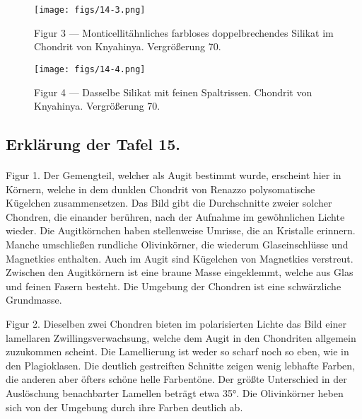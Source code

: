 \documentclass[a4paper, 12pt, oneside]{article}
\begin{document}
\vspace*{\fill}
\begin{figure}[H]
\centering
\texttt{[image: figs/14-3.png]}
\caption{\small Figur 3 --- Monticellitähnliches farbloses doppelbrechendes Silikat im Chondrit von Knyahinya. Vergrößerung 70.}
\end{figure}
\vspace*{\fill}
\clearpage

\vspace*{\fill}
\begin{figure}[H]
\centering
\texttt{[image: figs/14-4.png]}
\caption{\small Figur 4 --- Dasselbe Silikat mit feinen Spaltrissen. Chondrit von Knyahinya. Vergrößerung 70.}
\end{figure}
\vspace*{\fill}
\clearpage

\subsection{Erklärung der Tafel 15.}
\paragraph{}
Figur 1. Der Gemengteil, welcher als Augit bestimmt wurde, erscheint hier in Körnern, welche in dem dunklen Chondrit von Renazzo polysomatische Kügelchen zusammensetzen. Das Bild gibt die Durchschnitte zweier solcher Chondren, die einander berühren, nach der Aufnahme im gewöhnlichen Lichte wieder. Die Augitkörnchen haben stellenweise Umrisse, die an Kristalle erinnern. Manche umschließen rundliche Olivinkörner, die wiederum Glaseinschlüsse und Magnetkies enthalten. Auch im Augit sind Kügelchen von Magnetkies verstreut. Zwischen den Augitkörnern ist eine braune Masse eingeklemmt, welche aus Glas und feinen Fasern besteht. Die Umgebung der Chondren ist eine schwärzliche Grundmasse.

Figur 2. Dieselben zwei Chondren bieten im polarisierten Lichte das Bild einer lamellaren Zwillingsverwachsung, welche dem Augit in den Chondriten allgemein zuzukommen scheint. Die Lamellierung ist weder so scharf noch so eben, wie in den Plagioklasen. Die deutlich gestreiften Schnitte zeigen wenig lebhafte Farben, die anderen aber öfters schöne helle Farbentöne. Der größte Unterschied in der Auslöschung benachbarter Lamellen beträgt etwa 35°. Die Olivinkörner heben sich von der Umgebung durch ihre Farben deutlich ab.
\end{document}
